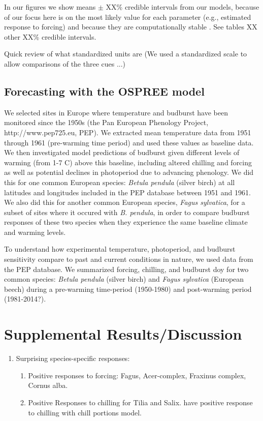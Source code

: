 \documentclass{article}
\begin{document}
In our figures  we show means $\pm$ XX\% credible intervals from our models, because of our focus here is on the most likely value for each parameter (e.g., estimated response to forcing) and because they are computationally stable \citep{BDA,Carpenter:2016aa}. See tables XX other XX\% credible intervals. 


\par Quick review of what standardized units are (We used a standardized scale to allow comparisons of the three cues ...)

\subsection*{Forecasting with the OSPREE model}
We selected sites in Europe where temperature and budburst have been monitored since the 1950s (the Pan European Phenology Project, http://www.pep725.eu, PEP). We extracted mean temperature data from 1951 through 1961 (pre-warming time period) and used these values as baseline data. We then investigated model predictions of budburst given different levels of warming (from 1-7 \degree C) above this baseline, including altered chilling and forcing as well as potential declines in photoperiod due to advancing phenology. We did this for one common European species: \emph{Betula pendula} (silver birch) at all latitudes and longitudes included in the PEP database between 1951 and 1961. We also did this for another common European species, \emph{Fagus sylvatica}, for a subset of sites where it occured with \emph{B. pendula}, in order to compare budburst responses of these two species when they experience the same baseline climate and warming levels.

\par To understand how experimental temperature, photoperiod, and budburst sensitivity compare to past and current conditions in nature, we used data from the PEP database. We summarized forcing, chilling, and budburst doy for two common species: \emph{Betula pendula} (silver birch) and \emph{Fagus sylvatica} (European beech) during a pre-warming time-period (1950-1980) and post-warming period (1981-2014?). 

\section*{Supplemental Results/Discussion}
\begin{enumerate}
\item Surprising species-specific responses: 
\begin{enumerate}

\item Positive responses to forcing: Fagus, Acer-complex, Fraxinus complex, Cornus alba.
\item Positive Responses to chilling for Tilia and Salix.  have positive response to chilling with chill portions model.

\end{enumerate}
\end{enumerate}
\end{document}
